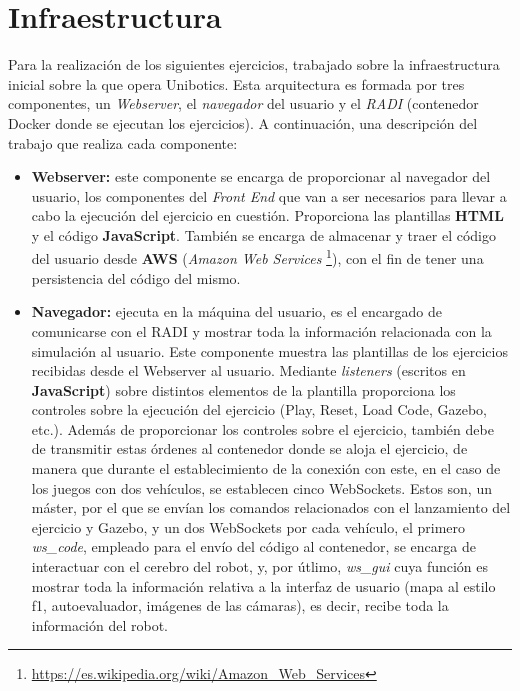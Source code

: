 \documentclass[a4paper, 12pt]{book}
\begin{document}
\section{Infraestructura}
\label{sec:async_infraestructura}

Para la realización de los siguientes ejercicios, trabajado sobre la infraestructura inicial sobre la que opera Unibotics. Esta arquitectura es formada por tres componentes, un \emph{Webserver}, el \emph{navegador} del usuario y el \emph{RADI} (contenedor Docker donde se ejecutan los ejercicios). A continuación, una descripción del trabajo que realiza cada componente:

\begin{itemize}
\item \textbf{Webserver:} este componente se encarga de proporcionar al navegador del usuario, los componentes del \emph{Front End} que van a ser  necesarios para llevar a cabo la ejecución del ejercicio en cuestión. Proporciona las plantillas \textbf{HTML} y el código \textbf{JavaScript}. También se encarga de almacenar y traer el código del usuario desde \textbf{AWS} (\emph{Amazon Web Services} \footnote{\url{https://es.wikipedia.org/wiki/Amazon_Web_Services}}), con el fin de tener una persistencia del código del mismo.

\item \textbf{Navegador:} ejecuta en la máquina del usuario, es el encargado de comunicarse con el RADI y mostrar toda la información relacionada con la simulación al usuario. Este componente muestra las plantillas de los ejercicios recibidas desde el Webserver al usuario. Mediante \emph{listeners} (escritos en \textbf{JavaScript}) sobre distintos elementos de la plantilla proporciona los controles sobre la ejecución del ejercicio (Play, Reset, Load Code, Gazebo, etc.). Además de proporcionar los controles sobre el ejercicio, también debe de transmitir estas órdenes al contenedor donde se aloja el ejercicio, de manera que durante el establecimiento de la conexión con este, en el caso de los juegos con dos vehículos, se establecen cinco WebSockets. Estos son, un máster, por el que se envían los comandos relacionados con el lanzamiento del ejercicio y Gazebo, y un dos WebSockets por cada vehículo, el primero \emph{ws\_code}, empleado para el envío del código al contenedor, se encarga de interactuar con el cerebro del robot, y, por útlimo, \emph{ws\_gui} cuya función es mostrar toda la información relativa a la interfaz de usuario (mapa al estilo f1, autoevaluador, imágenes de las cámaras), es decir, recibe toda la información del robot.


\end{itemize}
\end{document}
